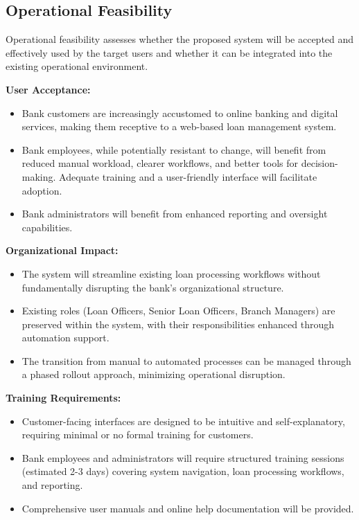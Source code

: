 \documentclass[12pt,a4paper,oneside]{report}
\begin{document}
\subsection{Operational Feasibility}

Operational feasibility assesses whether the proposed system will be accepted and effectively used by the target users and whether it can be integrated into the existing operational environment.

\textbf{User Acceptance:}

\begin{itemize}
  \item Bank customers are increasingly accustomed to online banking and digital services, making them receptive to a web-based loan management system.
  \item Bank employees, while potentially resistant to change, will benefit from reduced manual workload, clearer workflows, and better tools for decision-making. Adequate training and a user-friendly interface will facilitate adoption.
  \item Bank administrators will benefit from enhanced reporting and oversight capabilities.
\end{itemize}

\textbf{Organizational Impact:}

\begin{itemize}
  \item The system will streamline existing loan processing workflows without fundamentally disrupting the bank's organizational structure.
  \item Existing roles (Loan Officers, Senior Loan Officers, Branch Managers) are preserved within the system, with their responsibilities enhanced through automation support.
  \item The transition from manual to automated processes can be managed through a phased rollout approach, minimizing operational disruption.
\end{itemize}

\textbf{Training Requirements:}

\begin{itemize}
  \item Customer-facing interfaces are designed to be intuitive and self-explanatory, requiring minimal or no formal training for customers.
  \item Bank employees and administrators will require structured training sessions (estimated 2-3 days) covering system navigation, loan processing workflows, and reporting.
  \item Comprehensive user manuals and online help documentation will be provided.
\end{itemize}
\end{document}
